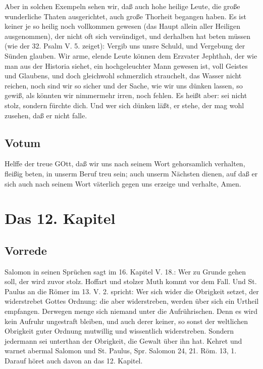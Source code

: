 Aber in solchen Exempeln sehen wir, daß auch hohe heilige Leute, die große wunderliche Thaten ausgerichtet, auch große Thorheit begangen haben. Es ist keiner je so heilig noch vollkommen gewesen (das Haupt allein aller Heiligen ausgenommen), der nicht oft sich versündiget, und derhalben hat beten müssen (wie der 32. Psalm V. 5. zeiget): Vergib uns unsre Schuld, und Vergebung der Sünden glauben. Wir arme, elende Leute können dem Erzvater Jephthah, der wie man aus der Historia siehet, ein hochgeleuchter Mann gewesen ist, voll Geistes und Glaubens, und doch gleichwohl schmerzlich strauchelt, das Wasser nicht reichen, noch sind wir so sicher und der Sache, wie wir uns dünken lassen, so gewiß, als könnten wir nimmermehr irren, noch fehlen. Es heißt aber: sei nicht stolz, sondern fürchte dich. Und wer sich dünken läßt, er stehe, der mag wohl zusehen, daß er nicht falle.

\section{Votum}

Helffe der treue GOtt, daß wir uns nach seinem Wort gehorsamlich verhalten, fleißig
beten, in unserm Beruf treu sein; auch unserm Nächsten dienen, auf daß er sich auch nach seinem Wort väterlich gegen uns erzeige und verhalte, Amen.

\chapter{Das 12. Kapitel}

\section{Vorrede}

Salomon in seinen Sprüchen sagt im 16. Kapitel V. 18.: Wer zu Grunde gehen soll, der wird zuvor stolz. Hoffart und stolzer Muth kommt vor dem Fall. Und St. Paulus an die Römer im 13. V. 2. spricht: Wer sich wider die Obrigkeit setzet, der widerstrebet Gottes Ordnung: die aber widerstreben, werden über sich ein Urtheil empfangen. Derwegen menge sich niemand unter die Aufrührischen. Denn es wird kein Aufruhr ungestraft bleiben, und auch derer keiner, so sonst der weltlichen Obrigkeit guter Ordnung mutwillig und wissentlich widerstreben. Sondern jedermann sei unterthan der Obrigkeit, die Gewalt über ihn hat. Kehret und warnet abermal Salomon und St. Paulus, Spr. Salomon 24, 21. Röm. 13, 1. Darauf höret auch davon an das 12. Kapitel.

